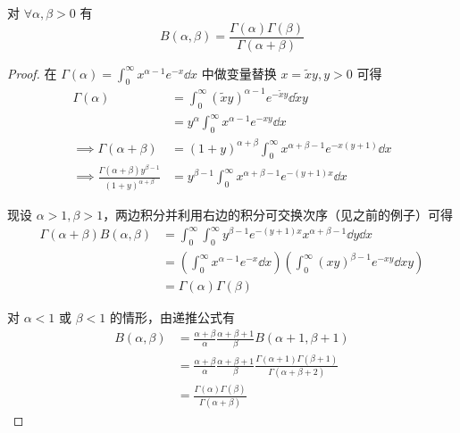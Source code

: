 \begin{property}
    对 $\forall\alpha,\beta>0$ 有
$$
B(\alpha,\beta)=\frac{\Gamma(\alpha)\Gamma(\beta)}{\Gamma(\alpha+\beta)}
$$
\end{property}
\begin{proof}
    在 $\Gamma(\alpha)=\displaystyle\int_0^\infty x^{\alpha-1}e^{-x}\dd x$ 中做变量替换 $x=\widetilde{x}y,y>0$ 可得
$$
\begin{aligned}
    \Gamma(\alpha)&=\int_0^\infty(\widetilde{x}y)^{\alpha-1}e^{-\widetilde{x}y}\dd\widetilde{x}y\\
    &=y^\alpha\int_0^\infty x^{\alpha-1}e^{-xy}\dd x\\
    \implies\Gamma(\alpha+\beta)&=(1+y)^{\alpha+\beta}\int_0^\infty x^{\alpha+\beta-1}e^{-x(y+1)}\dd x\\
    \implies\frac{\Gamma(\alpha+\beta)y^{\beta-1}}{(1+y)^{\alpha+\beta}}&=y^{\beta-1}\int_0^\infty x^{\alpha+\beta-1}e^{-(y+1)x}\dd x
\end{aligned}
$$

    现设 $\alpha>1,\beta>1$，两边积分并利用右边的积分可交换次序（见之前的例子）可得
$$
\begin{aligned}
    \Gamma(\alpha+\beta)B(\alpha,\beta)&=\int_0^\infty\int_0^\infty y^{\beta-1}e^{-(y+1)x}x^{\alpha+\beta-1}\dd y\dd x\\
    &=\left(\int_0^\infty x^{\alpha-1}e^{-x}\dd x\right)\left(\int_0^\infty (xy)^{\beta-1}e^{-xy}\dd xy\right)\\
    &=\Gamma(\alpha)\Gamma(\beta)
\end{aligned}
$$

    对 $\alpha<1$ 或 $\beta<1$ 的情形，由递推公式有
$$
\begin{aligned}
    B(\alpha,\beta)&=\frac{\alpha+\beta}{\alpha}\frac{\alpha+\beta+1}{\beta}B(\alpha+1,\beta+1)\\
    &=\frac{\alpha+\beta}{\alpha}\frac{\alpha+\beta+1}{\beta}\frac{\Gamma(\alpha+1)\Gamma(\beta+1)}{\Gamma(\alpha+\beta+2)}\\
    &=\frac{\Gamma(\alpha)\Gamma(\beta)}{\Gamma(\alpha+\beta)}
\end{aligned}
$$
\end{proof}


